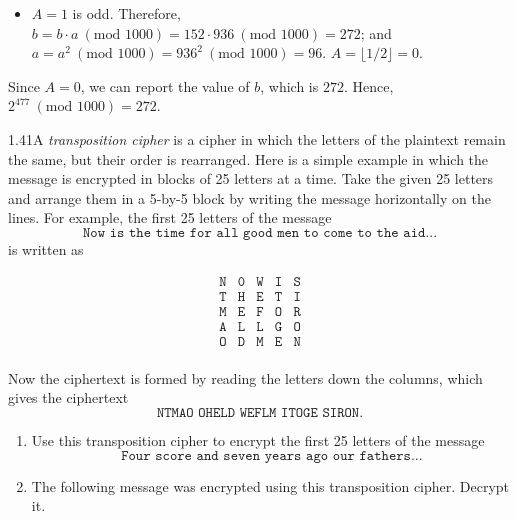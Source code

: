 {\begin{enumerate}
\begin{itemize}
                  \item \(A = 1\) is odd. Therefore, \(b = b \cdot a \ (\text{mod } 1000) = 152 \cdot 936 \ (\text{mod } 1000) = 272\); and \(a = a^2 \ (\text{mod } 1000) = 936^2 \ (\text{mod } 1000) = 96\). \(A = \lfloor 1 / 2 \rfloor = 0\).
              \end{itemize}
              Since \(A = 0\), we can report the value of \(b\), which is \(272\). Hence, \(2^477 \ (\text{mod }1000) = 272\).
    \end{enumerate}
}

\begin{exercise}
    {1.41}A \textit{transposition cipher} is a cipher in which the letters of the plaintext remain the same, but their order is rearranged. Here is a simple example in which the message is encrypted in blocks of 25 letters at a time. Take the given 25 letters and arrange them in a 5-by-5 block by writing the message horizontally on the lines. For example, the first 25 letters of the message
    \[\texttt{Now is the time for all good men to come to the aid...} \]
    is written as
    \begin{center}
        \vspace*{-1cm}
        \[
            \begin{array}{ccccc}
                \texttt{N} & \texttt{0} & \texttt{W} & \texttt{I} & \texttt{S} \\
                \texttt{T} & \texttt{H} & \texttt{E} & \texttt{T} & \texttt{I} \\
                \texttt{M} & \texttt{E} & \texttt{F} & \texttt{O} & \texttt{R} \\
                \texttt{A} & \texttt{L} & \texttt{L} & \texttt{G} & \texttt{O} \\
                \texttt{O} & \texttt{D} & \texttt{M} & \texttt{E} & \texttt{N} \\
            \end{array}
        \]
    \end{center}
    Now the ciphertext is formed by reading the letters down the columns, which gives the ciphertext
    \[\texttt{NTMAO OHELD WEFLM ITOGE SIRON.}\]
    \begin{enumerate}
        \item Use this transposition cipher to encrypt the first 25 letters of the message
              \[\texttt{Four score and seven years ago our fathers...}\]
        \item The following message was encrypted using this transposition cipher. Decrypt it.

\end{enumerate}
\end{exercise}
